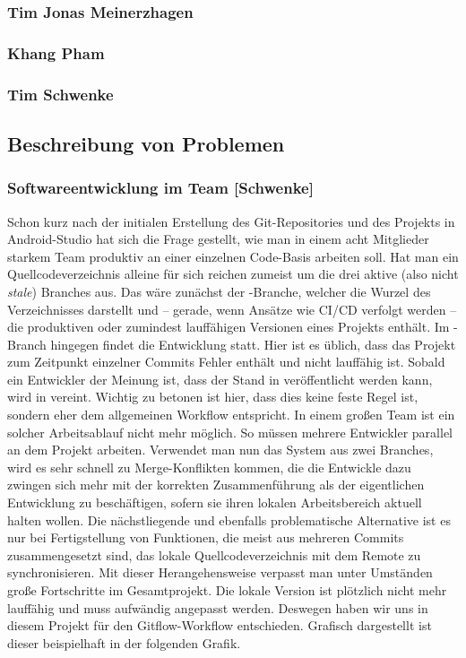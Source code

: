 \subsubsection{Tim Jonas Meinerzhagen}

\subsubsection{Khang Pham}

\subsubsection{Tim Schwenke}

\subsection{Beschreibung von Problemen}

\subsubsection{Softwareentwicklung im Team [Schwenke]}

Schon kurz nach der initialen Erstellung des Git-Repositories und des Projekts in Android-Studio hat sich die Frage gestellt, wie man in einem acht Mitglieder starkem Team produktiv an einer einzelnen Code-Basis arbeiten soll. Hat man ein Quellcodeverzeichnis alleine für sich reichen zumeist um die drei aktive (also nicht \textit{stale}) Branches aus. Das wäre zunächst der -Branche, welcher die Wurzel des Verzeichnisses darstellt und – gerade, wenn Ansätze wie CI/CD verfolgt werden – die produktiven oder zumindest lauffähigen Versionen eines Projekts enthält. Im -Branch hingegen findet die Entwicklung statt. Hier ist es üblich, dass das Projekt zum Zeitpunkt einzelner Commits Fehler enthält und nicht lauffähig ist. Sobald ein Entwickler der Meinung ist, dass der Stand in  veröffentlicht werden kann, wird  in  vereint. Wichtig zu betonen ist hier, dass dies keine feste Regel ist, sondern eher dem allgemeinen Workflow entspricht. In einem großen Team ist ein solcher Arbeitsablauf nicht mehr möglich. So müssen mehrere Entwickler parallel an dem Projekt arbeiten. Verwendet man nun das System aus zwei Branches, wird es sehr schnell zu Merge-Konflikten kommen, die die Entwickle dazu zwingen sich mehr mit der korrekten Zusammenführung als der eigentlichen Entwicklung zu beschäftigen, sofern sie ihren lokalen Arbeitsbereich aktuell halten wollen. Die nächstliegende und ebenfalls problematische Alternative ist es nur bei Fertigstellung von Funktionen, die meist aus mehreren Commits zusammengesetzt sind, das lokale Quellcodeverzeichnis mit dem Remote zu synchronisieren. Mit dieser Herangehensweise verpasst man unter Umständen große Fortschritte im Gesamtprojekt. Die lokale Version ist plötzlich nicht mehr lauffähig und muss aufwändig angepasst werden. Deswegen haben wir uns in diesem Projekt für den Gitflow-Workflow entschieden. Grafisch dargestellt ist dieser beispielhaft in der folgenden Grafik.

